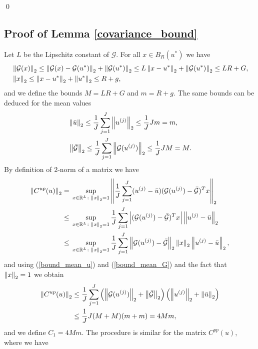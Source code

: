 \qed

\subsection*{Proof of Lemma \ref{covariance_bound}}

Let $L$ be the Lipschitz constant of $\mathcal{G}$. For all $x \in B_R(u^*)$ we have
\begin{align*}
& \left\|\mathcal{G}(x)\right\|_2 \le \left\|\mathcal{G}(x) - \mathcal{G}(u^*)\right\|_2 + \left\|\mathcal{G}(u^*)\right\|_2 \le L \left\|x - u^*\right\|_2 + \left\|\mathcal{G}(u^*)\right\|_2 \le LR + G, \\
& \left\|x\right\|_2 \le \left\|x - u^*\right\|_2 + \left\|u^*\right\|_2 \le R + g,
\end{align*}
and we define the bounds $M = LR + G$ and $m = R + g$. The same bounds can be deduced for the mean values
\begin{align}
\label{bound_mean_u}
& \left\|\bar{u}\right\|_2 \le \frac{1}{J} \sum_{j=1}^J \left\|u^{(j)}\right\|_2 \le \frac{1}{J} J m = m, \\
\label{bound_mean_G}
& \left\|\bar{\mathcal{G}}\right\|_2 \le \frac{1}{J} \sum_{j=1}^J \left\|\mathcal{G}(u^{(j)})\right\|_2 \le \frac{1}{J} J M = M.
\end{align}
By definition of $2$-norm of a matrix we have
\begin{align*}
\left\|C^{up}(u)\right\|_2 = & \; \sup_{x \in \mathbb{R}^L \colon \left\|x\right\|_2 = 1} \left \lVert \frac{1}{J} \sum_{j=1}^J (u^{(j)} - \bar{u}) (\mathcal{G}(u^{(j)}) - \bar{\mathcal{G}})^T x \right \rVert_2 \\
\le & \; \sup_{x \in \mathbb{R}^L \colon \left\|x\right\|_2 = 1} \frac{1}{J} \sum_{j=1}^J \left | (\mathcal{G}(u^{(j)}) - \bar{\mathcal{G}})^T x \right | \left\|u^{(j)} - \bar{u}\right\|_2 \\
\le & \; \sup_{x \in \mathbb{R}^L \colon \left\|x\right\|_2 = 1} \frac{1}{J} \sum_{j=1}^J \left \lVert \mathcal{G}(u^{(j)}) - \bar{\mathcal{G}} \right \rVert_2 \left\|x\right\|_2 \left\|u^{(j)} - \bar{u}\right\|_2,
\end{align*}
and using (\ref{bound_mean_u}) and (\ref{bound_mean_G}) and the fact that $\left\|x\right\|_2 = 1$ we obtain
\begin{align*}
\left\|C^{up}(u)\right\|_2 \le & \; \frac{1}{J} \sum_{j=1}^J \left ( \left\|\mathcal{G}(u^{(j)})\right\|_2 + \left\|\bar{\mathcal{G}}\right\|_2 \right ) \left ( \left\|u^{(j)}\right\|_2 + \left\|\bar{u}\right\|_2 \right ) \\
\le & \; \frac{1}{J} J (M + M) (m + m) = 4Mm,
\end{align*}
and we define $C_1 = 4Mm$.
The procedure is similar for the matrix $C^{pp}(u)$, where we have
